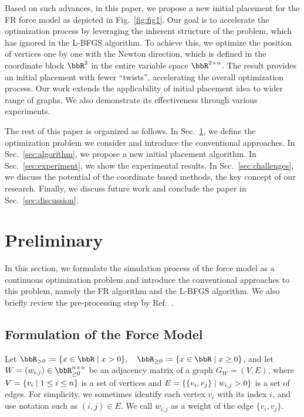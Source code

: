 \documentclass[dvipdfmx,10pt,journal,compsoc]{IEEEtran}
\newcommand{\defeq}{\coloneqq}
\begin{document}
Based on such advances, in this paper, we propose a new initial placement for the FR force model as depicted in Fig.~\ref{fig:fig1}.
Our goal is to accelerate the optimization process by leveraging the inherent structure of the problem, which has ignored in the L-BFGS algorithm.
To achieve this, we optimize the position of vertices one by one with the Newton direction, which is defined in the coordinate block $\bbR^2$ in the entire variable space $\bbR^{2 \times n}$.
The result provides an initial placement with fewer ``twists'', accelerating the overall optimization process. Our work extends the applicability of initial placement idea to wider range of graphs.
We also demonstrate its effectiveness through various experiments.

The rest of this paper is organized as follows.
In Sec.~\ref{sec:preliminary}, we define the optimization problem we consider and introduce the conventional approaches.
In Sec.~\ref{sec:algorithm}, we propose a new initial placement algorithm.
In Sec.~\ref{sec:experiment}, we show the experimental results.
In Sec.~\ref{sec:challenges}, we discuss the potential of the coordinate based methods, the key concept of our research.
Finally, we discuss future work and conclude the paper in Sec.~\ref{sec:discussion}.

\section{Preliminary}\label{sec:preliminary}

In this section, we formulate the simulation process of the force model as a continuous optimization problem and introduce the conventional approaches to this problem, namely the FR algorithm and the L-BFGS algorithm. We also briefly review the pre-processing step by Ref.~\cite{ghassemitoosiSimulatedAnnealingPreProcessing2016}.

\subsection{Formulation of the Force Model}\label{ssec:forceModel}

Let $\bbR_{> 0} \defeq \qty{ x \in \bbR \mid x > 0 }, \quad \bbR_{\geq 0} \defeq \qty{ x \in \bbR \mid x \geq 0 }$, and let $W = (w_{i,j}) \in \bbR_{\geq 0}^{n \times n}$ be an adjacency matrix of a graph $G_W = (V, E)$, where $V = \qty{v_i \mid 1 \leq i \leq n}$ is a set of vertices and $E = \qty{\{v_i, v_j\} \mid w_{i,j} > 0}$ is a set of edges.
For simplicity, we sometimes identify each vertex $v_i$ with its index $i$, and use notation such as $(i, j) \in E$.
We call $w_{i,j}$ as a weight of the edge $\{v_i,v_j\}$.
\end{document}
